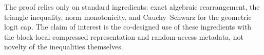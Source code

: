 \begin{remark}
The proof relies only on standard ingredients: exact algebraic rearrangement, the triangle inequality, norm monotonicity, and Cauchy--Schwarz for the geometric logit cap. The claim of interest is the co-designed use of these ingredients with the block-local compressed representation and random-access metadata, not novelty of the inequalities themselves.
\end{remark}
